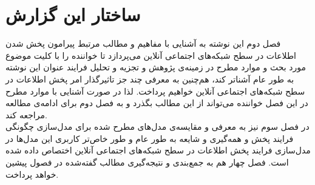 \section{ساختار این گزارش}
\begin{persian}
\noindent
فصل دوم این نوشته به آشنایی با مفاهیم و مطالب مرتبط پیرامون پخش شدن اطلاعات در سطح شبکه‌های اجتماعی آنلاین می‌پردازد تا خواننده را با کلیت موضوع مورد‌ بحث و موارد مطرح در زمینه‌ی پژوهش ‌و تجزیه‌ و تحلیل فرایند‌ عنوان این نوشته به طور عام آشناتر کند، هم‌چنین به معرفی چند جز تاثیرگذار امر پخش‌ اطلاعات در سطح شبکه‌های اجتماعی آنلاین خواهیم پرداخت. لذا در صورت آشنایی با موارد مطرح در این فصل خواننده می‌تواند از این مطالب بگذرد و به فصل دوم برای ادامه‌ی مطالعه مراجعه کند.
\\
\indent 
در فصل سوم نیز به معرفی و مقایسه‌ی مدل‌های مطرح ‌شده برای مدل‌سازی چگونگی فرایند پخش و همه‌گیری و شایعه به طور عام و طور خاص‌تر کاربری این مدل‌ها در مدل‌سازی فرایند پخش اطلاعات در سطح شبکه‌های اجتماعی آنلاین اختصاص داده شده است. فصل چهار هم به جمع‌بندی و نتیجه‌گیری مطالب گفته‌شده در فصول پیشین خواهد پرداخت.
 
\end{persian}

